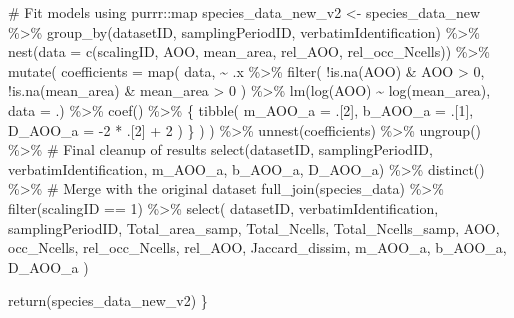 \documentclass[
  letterpaper,
  DIV=11,
  numbers=noendperiod]{scrreprt}
\newenvironment{Shaded}{\begin{snugshade}}{\end{snugshade}}
\newcommand{\AttributeTok}[1]{\textcolor[rgb]{0.40,0.45,0.13}{#1}}
\newcommand{\CommentTok}[1]{\textcolor[rgb]{0.37,0.37,0.37}{#1}}
\newcommand{\DecValTok}[1]{\textcolor[rgb]{0.68,0.00,0.00}{#1}}
\newcommand{\FunctionTok}[1]{\textcolor[rgb]{0.28,0.35,0.67}{#1}}
\newcommand{\NormalTok}[1]{\textcolor[rgb]{0.00,0.23,0.31}{#1}}
\newcommand{\OtherTok}[1]{\textcolor[rgb]{0.00,0.23,0.31}{#1}}
\newcommand{\SpecialCharTok}[1]{\textcolor[rgb]{0.37,0.37,0.37}{#1}}
\begin{document}
\begin{Shaded}
\begin{Highlighting}[]
  \CommentTok{\# Fit models using purrr::map}
\NormalTok{  species\_data\_new\_v2 }\OtherTok{\textless{}{-}}\NormalTok{ species\_data\_new }\SpecialCharTok{\%\textgreater{}\%}
    \FunctionTok{group\_by}\NormalTok{(datasetID, samplingPeriodID, verbatimIdentification) }\SpecialCharTok{\%\textgreater{}\%}
    \FunctionTok{nest}\NormalTok{(}\AttributeTok{data =} \FunctionTok{c}\NormalTok{(scalingID, AOO, mean\_area, rel\_AOO, rel\_occ\_Ncells)) }\SpecialCharTok{\%\textgreater{}\%}
    \FunctionTok{mutate}\NormalTok{(}
      \AttributeTok{coefficients =} \FunctionTok{map}\NormalTok{(}
\NormalTok{        data,}
        \SpecialCharTok{\textasciitilde{}}\NormalTok{ .x }\SpecialCharTok{\%\textgreater{}\%}
          \FunctionTok{filter}\NormalTok{(}
            \SpecialCharTok{!}\FunctionTok{is.na}\NormalTok{(AOO) }\SpecialCharTok{\&}\NormalTok{ AOO }\SpecialCharTok{\textgreater{}} \DecValTok{0}\NormalTok{,}
            \SpecialCharTok{!}\FunctionTok{is.na}\NormalTok{(mean\_area) }\SpecialCharTok{\&}\NormalTok{ mean\_area }\SpecialCharTok{\textgreater{}} \DecValTok{0}
\NormalTok{          ) }\SpecialCharTok{\%\textgreater{}\%}
          \FunctionTok{lm}\NormalTok{(}\FunctionTok{log}\NormalTok{(AOO) }\SpecialCharTok{\textasciitilde{}} \FunctionTok{log}\NormalTok{(mean\_area), }\AttributeTok{data =}\NormalTok{ .) }\SpecialCharTok{\%\textgreater{}\%}
          \FunctionTok{coef}\NormalTok{() }\SpecialCharTok{\%\textgreater{}\%}
\NormalTok{          \{}
            \FunctionTok{tibble}\NormalTok{(}
              \AttributeTok{m\_AOO\_a =}\NormalTok{ .[}\DecValTok{2}\NormalTok{],}
              \AttributeTok{b\_AOO\_a =}\NormalTok{ .[}\DecValTok{1}\NormalTok{],}
              \AttributeTok{D\_AOO\_a =} \SpecialCharTok{{-}}\DecValTok{2} \SpecialCharTok{*}\NormalTok{ .[}\DecValTok{2}\NormalTok{] }\SpecialCharTok{+} \DecValTok{2}
\NormalTok{            )}
\NormalTok{          \}}
\NormalTok{      )}
\NormalTok{    ) }\SpecialCharTok{\%\textgreater{}\%}
    \FunctionTok{unnest}\NormalTok{(coefficients) }\SpecialCharTok{\%\textgreater{}\%}
    \FunctionTok{ungroup}\NormalTok{() }\SpecialCharTok{\%\textgreater{}\%}
    \CommentTok{\# Final cleanup of results}
    \FunctionTok{select}\NormalTok{(datasetID, samplingPeriodID, verbatimIdentification, m\_AOO\_a, b\_AOO\_a, D\_AOO\_a) }\SpecialCharTok{\%\textgreater{}\%}
    \FunctionTok{distinct}\NormalTok{() }\SpecialCharTok{\%\textgreater{}\%}
    \CommentTok{\# Merge with the original dataset}
    \FunctionTok{full\_join}\NormalTok{(species\_data) }\SpecialCharTok{\%\textgreater{}\%}
    \FunctionTok{filter}\NormalTok{(scalingID }\SpecialCharTok{==} \DecValTok{1}\NormalTok{) }\SpecialCharTok{\%\textgreater{}\%}
    \FunctionTok{select}\NormalTok{(}
\NormalTok{      datasetID, verbatimIdentification, samplingPeriodID, Total\_area\_samp,}
\NormalTok{      Total\_Ncells, Total\_Ncells\_samp, AOO, occ\_Ncells, rel\_occ\_Ncells,}
\NormalTok{      rel\_AOO, Jaccard\_dissim, m\_AOO\_a, b\_AOO\_a, D\_AOO\_a}
\NormalTok{    )}

  \FunctionTok{return}\NormalTok{(species\_data\_new\_v2)}
\NormalTok{\}}
\end{Highlighting}
\end{Shaded}
\end{document}
